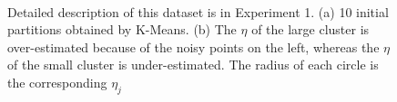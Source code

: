\documentclass[conference]{IEEEtran}
\theoremstyle{definition}
\begin{document}
\begin{figure}[tb]
\captionsetup[subfloat]{farskip=1pt,captionskip=1pt}%
   \centering
    \\
\caption{Detailed description of this dataset is in Experiment 1. (a) 10 initial partitions obtained by K-Means. (b) The $\eta$ of the large cluster is over-estimated because of the noisy points on the left, whereas the $\eta$ of the small cluster is under-estimated. The radius of each circle is the corresponding $\eta_j$}
\label{fig_eta}
\end{figure}
\end{document}
